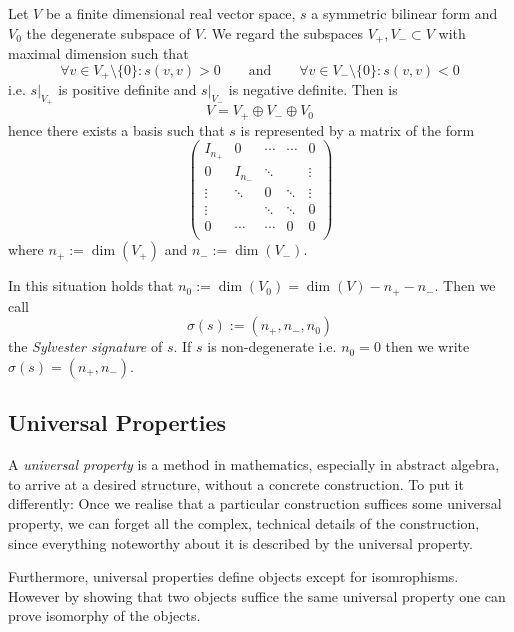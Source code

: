 \begin{proposition}\label{pro:sylv_law_inertia}
   Let \(V\) be a finite dimensional real vector space, \(s\) a symmetric bilinear form and \(V_0\) the degenerate subspace of \(V\).
   We regard the subspaces \(V_+, V_- \subset V\) with maximal dimension such that
   \[\forall v \in V_+ \setminus \{0\}: s(v, v) > 0 \qquad\text{and}\qquad \forall v \in V_- \setminus \{0\}: s(v, v) < 0\]
   i.e. \(s\rvert_{V_+}\) is positive definite and \(s\rvert_{V_-}\) is negative definite.
   Then is
   \[V = V_+ \oplus V_- \oplus V_0\]
   hence there exists a basis such that \(s\) is represented by a matrix of the form
   \[\begin{pmatrix}
         I_{n_+} & 0       & \cdots & \cdots & 0\\
         0       & I_{n_-} & \ddots &        & \vdots \\
         \vdots  & \ddots  & 0      & \ddots & \vdots \\
         \vdots  &         & \ddots & \ddots & 0 \\
         0       & \cdots  & \cdots & 0      & 0\\
      \end{pmatrix}\]
      where \(n_+ := \dim(V_+)\) and \(n_- := \dim(V_-)\).
\end{proposition}
\begin{remark}
   In this situation holds that \(n_0 := \dim(V_0) = \dim(V) - n_+ - n_-\).
   Then we call
   \[\sigma(s) := (n_+, n_-, n_0)\]
   the \emph{Sylvester signature} of \(s\).
   If \(s\) is non-degenerate i.e. \(n_0 = 0\) then we write \(\sigma(s) = (n_+, n_-)\).
\end{remark}

\subsection{Universal Properties}
A \emph{universal property} is a method in mathematics, especially in abstract algebra, to arrive at a desired structure, without a concrete construction.
To put it differently: Once we realise that a particular construction suffices some universal property, we can forget all the complex, technical details of the construction, since everything noteworthy about it is described by the universal property.

Furthermore, universal properties define objects except for isomrophisms.
However by showing that two objects suffice the same universal property one can prove isomorphy of the objects.


